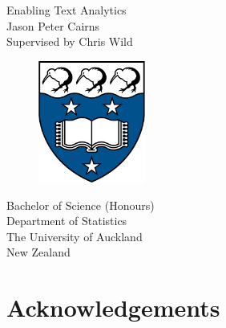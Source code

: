 \documentclass[11pt, a4paper, titlepage]{report}
\begin{document}
\begin{titlepage}
  \centering \vspace*{2.5cm}
  {\Huge Enabling Text Analytics}\\
  \vspace{1.5cm}
  {\Large Jason Peter Cairns}\\
  \vspace{1.5cm}
  Supervised by Chris Wild\\
  \vspace{1.5cm}
  \begin{figure}[h]
    \centering \includegraphics[height=4cm]{img/uoalogo.png}
  \end{figure}
  \vspace{1cm}
  Bachelor of Science (Honours)\\
  Department of Statistics\\
  The University of Auckland\\
  New Zealand
\end{titlepage}

\thispagestyle{empty} \null{}
\newpage

\begin{abstract}
  Text Analytics serves to reveal insights from a body of text. Within
  the broad category of text analytics, we seek to answer questions
  about what the text is communicating, what is felt about it, and how
  this information is structured. This report describes the creation
  of a user-friendly program to perform text analytics functions,
  using modern \texttt{R} with the Shiny web application framework. A
  literate style illustrates top-down the structure of such a program,
  as well as the data structures and computational processes that have
  established their value for it.
\end{abstract}

\setcounter{page}{1} 
\chapter*{Acknowledgements}\label{cha:acknowledgements}
\end{document}
